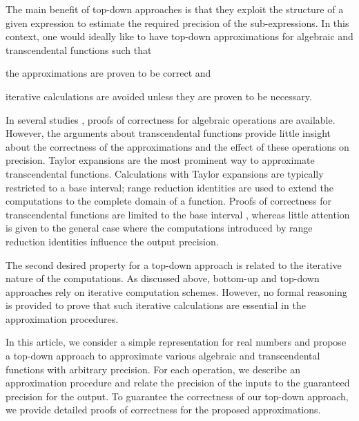 \documentclass{article}
\numberwithin{mytheorem}{section}
\begin{document}

The main benefit of top-down approaches is that they exploit the structure of a given expression to estimate the required precision of the sub-expressions. In this context, one would ideally like to have top-down approximations for algebraic and transcendental functions such that 
\begin{inparaenum}[1)]
\item
the approximations are proven to be correct and 
\item
iterative calculations are avoided unless they are proven to be necessary.
\end{inparaenum}

In several studies \cite{GL00,O08}, proofs of correctness for algebraic operations are available. However, the arguments about transcendental functions provide little insight about the correctness of the approximations and the effect of these operations on precision. Taylor expansions are the most prominent way to approximate transcendental functions. Calculations with Taylor expansions are typically restricted to a base interval; range reduction identities are used to extend the computations to the complete domain of a function. Proofs of correctness for transcendental functions are limited to the base interval \cite{P98,GL00,O08}, whereas little attention is given to the general case where the computations introduced by range reduction identities influence the output precision.  

The second desired property for a top-down approach is related to the iterative nature of the computations. As discussed above, bottom-up and top-down approaches rely on iterative computation schemes. However, no formal reasoning is provided to prove that such iterative calculations are essential in the approximation procedures.  

In this article, we consider a simple representation for real numbers and propose a top-down approach to approximate various algebraic and transcendental functions with arbitrary precision. For each operation, we describe an approximation procedure and relate the precision of the inputs to the guaranteed precision for the output. To guarantee the correctness of our top-down approach, we provide detailed proofs of correctness for the proposed approximations. 
\end{document}
